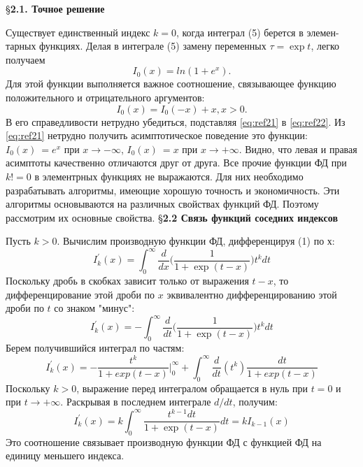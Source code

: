 \S \textbf{2.1. Точное решение }

Существует единственный индекс $k = 0$, когда интеграл (5) берется в элемен-
тарных функциях. Делая в интеграле (5) замену переменных $\tau = \exp{t}$, легко получаем
\begin{equation}
I_0(x) = ln(1+e^{x}).
\label{eq:ref21}
\end{equation}
Для этой функции выполняется важное соотношение, связывающее функцию положительного и отрицательного аргументов:
\begin{equation}
I_0(x) = I_0(-x) + x, x > 0.
\label{eq:ref22}
\end{equation}
В его справедливости нетрудно убедиться, подставляя \ref{eq:ref21} в \ref{eq:ref22}.
\newline
\indent
Из \ref{eq:ref21} нетрудно получить асимптотическое поведение это функции: $I_0(x)~=e^{x}$ при $ x \to -\infty$, $I_0(x)~= x$ при $x \to +\infty$. Видно, что левая и правая асимптоты качественно отличаются друг от друга.
\newline
\indent
Все прочие функции ФД при $k != 0$ в элементрных функциях не выражаются. Для них необходимо разрабатывать алгоритмы, имеющие хорошую точность и экономичность. Эти алгоритмы основываются на различных свойствах функций ФД. Поэтому рассмотрим их основные свойства.
\newline
\indent
\newline
\S \textbf{2.2 Связь функций соседних индексов}

Пусть $k > 0$. Вычислим производную функции ФД, дифференцируя (1) по $х$:
\begin{equation}
I_{k}^{'}(x) = \int_0^{\infty} \frac{d}{dx}\bigg(\frac{1}{1+\exp{(t-x)}}\bigg)t^{k}dt
\end{equation}
Поскольку дробь в скобках зависит только от выражения $t - x$, то
дифференцирование этой дроби по $x$ эквивалентно дифференцированию этой
дроби по $t$ со знаком "минус":
\begin{equation}
I_{k}^{'}(x) = -\int_0^{\infty} \frac{d}{dt}\bigg(\frac{1}{1+\exp{(t-x)}}\bigg)t^{k}dt
\end{equation}
Берем получившийся интеграл по частям:
\begin{equation}
I_{k}^{'}(x) = -\frac{t^{k}}{1+exp{(t-x)}}\bigg|_0^{\infty} + \int_0^{\infty} \frac{d}{dt}(t^k)\frac{dt}{1+exp{(t-x)}}
\end{equation}
Поскольку $k > 0$, выражение перед интегралом обращается в нуль при $t = 0$ и
при $t \to +\infty$. Раскрывая в последнем интеграле $d/dt$, получим:
\begin{equation}
I_{k}^{'}(x) = k\int_0^{\infty} \frac{t^{k-1}dt}{1+\exp{(t-x)}}dt = kI_{k-1}(x)
\label{eq:ref23}
\end{equation}
Это соотношение связывает производную функции ФД с функцией ФД на
единицу меньшего индекса.

